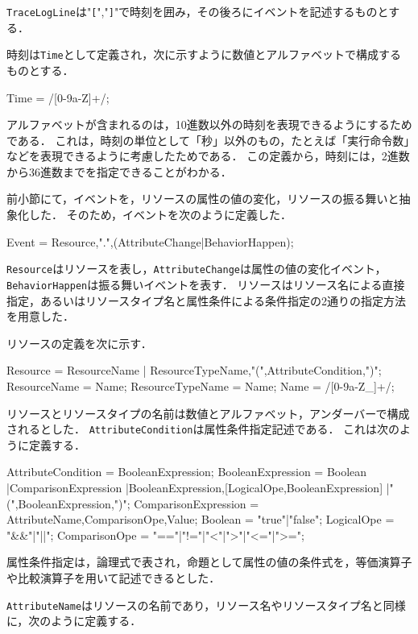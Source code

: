 \verb|TraceLogLine|は"\verb|[|","\verb|]|"で時刻を囲み，その後ろにイベントを記述するものとする．

時刻は\verb|Time|として定義され，次に示すように数値とアルファベットで構成するものとする．

\begin{EBNF}
Time = /[0-9a-Z]+/;
\end{EBNF}

アルファベットが含まれるのは，10進数以外の時刻を表現できるようにするためである．
これは，時刻の単位として「秒」以外のもの，たとえば「実行命令数」などを表現できるように考慮したためである．
この定義から，時刻には，2進数から36進数までを指定できることがわかる．

前小節にて，イベントを，リソースの属性の値の変化，リソースの振る舞いと抽象化した．
そのため，イベントを次のように定義した．

\begin{EBNF}
Event = Resource,".",(AttributeChange|BehaviorHappen);
\end{EBNF}

{\tt Resource}はリソースを表し，{\tt AttributeChange}は属性の値の変化イベント，{\tt BehaviorHappen}は振る舞いイベントを表す．
リソースはリソース名による直接指定，あるいはリソースタイプ名と属性条件による条件指定の2通りの指定方法を用意した．

リソースの定義を次に示す．

\begin{EBNF}
Resource = ResourceName
         | ResourceTypeName,"(",AttributeCondition,")";
ResourceName = Name;
ResourceTypeName = Name;
Name = /[0-9a-Z_]+/;
\end{EBNF}

リソースとリソースタイプの名前は数値とアルファベット，アンダーバーで構成されるとした．
{\tt AttributeCondition}は属性条件指定記述である．
これは次のように定義する．

\begin{EBNF}
AttributeCondition = BooleanExpression;
BooleanExpression = Boolean
   |ComparisonExpression
   |BooleanExpression,[{LogicalOpe,BooleanExpression}]
   |"(",BooleanExpression,")";
ComparisonExpression = AttributeName,ComparisonOpe,Value;
Boolean = "true"|"false";
LogicalOpe = "&&"|"||";
ComparisonOpe = "=="|"!="|"<"|">"|"<="|">=";
\end{EBNF}

属性条件指定は，論理式で表され，命題として属性の値の条件式を，等価演算子や比較演算子を用いて記述できるとした．

{\tt AttributeName}はリソースの名前であり，リソース名やリソースタイプ名と同様に，次のように定義する．


